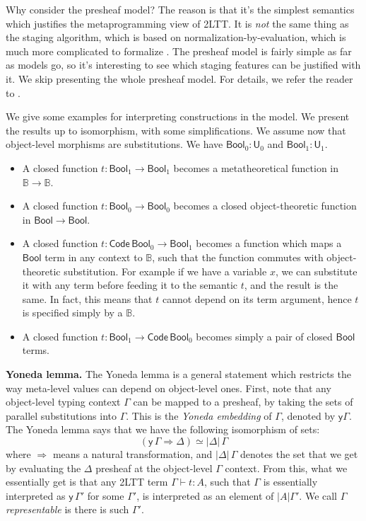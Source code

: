 \documentclass[11pt,a4paper,twoside]{article}
\newcommand{\msf}[1]{\mathsf{#1}}
\newcommand{\U}{\mathsf{U}}
\newcommand{\Code}{\mathsf{Code}}
\newcommand{\Bool}{\msf{Bool}}
\begin{document}
Why consider the presheaf model?  The reason is that it's the simplest semantics
which justifies the metaprogramming view of 2LTT. It is \emph{not} the same
thing as the staging algorithm, which is based on normalization-by-evaluation,
which is much more complicated to formalize \cite{bocquet2021induction}. The
presheaf model is fairly simple as far as models go, so it's interesting to see
which staging features can be justified with it. We skip presenting the whole
presheaf model. For details, we refer the reader to
\cite[Section~1.2]{huber-thesis}.

We give some examples for interpreting constructions in the model. We present the
results up to isomorphism, with some simplifications. We assume now that
object-level morphisms are substitutions. We have $\Bool_0 : \U_0$ and $\Bool_1
: \U_1$.
\begin{itemize}
  \item A closed function $t : \Bool_1 \to \Bool_1$ becomes a metatheoretical
    function in $\mathbb{B} \to \mathbb{B}$.
  \item A closed function $t : \Bool_0 \to \Bool_0$ becomes a closed object-theoretic
    function in $\Bool \to \Bool$.
  \item A closed function $t : \Code\,\Bool_0 \to \Bool_1$ becomes a function
    which maps a $\Bool$ term in any context to $\mathbb{B}$, such that the
    function commutes with object-theoretic substitution. For example if we have
    a variable $x$, we can substitute it with any term before feeding it to the
    semantic $t$, and the result is the same. In fact, this means that $t$
    cannot depend on its term argument, hence $t$ is specified simply by a
    $\mathbb{B}$.
  \item
    A closed function $t : \Bool_1 \to \Code\,\Bool_0$ becomes simply a pair of
    closed $\Bool$ terms.
\end{itemize}
\noindent\textbf{Yoneda lemma.} The Yoneda lemma is a general statement which
restricts the way meta-level values can depend on object-level ones. First, note that any
object-level typing context $\Gamma$ can be mapped to a presheaf, by taking the
sets of parallel substitutions into $\Gamma$. This is the \emph{Yoneda
embedding} of $\Gamma$, denoted by $\msf{y}\Gamma$. The Yoneda lemma says
that we have the following isomorphism of sets:
\[
   (\msf{y}\,\Gamma \Rightarrow \Delta) \simeq |\Delta|\,\Gamma
\]
where $\Rightarrow$ means a natural transformation, and $|\Delta|\,\Gamma$
denotes the set that we get by evaluating the $\Delta$ presheaf at the
object-level $\Gamma$ context. From this, what we essentially get is that any
2LTT term $\Gamma \vdash t : A$, such that $\Gamma$ is essentially interpreted
as $\msf{y}\,\Gamma'$ for some $\Gamma'$, is interpreted as an element of
$|A|\Gamma'$. We call $\Gamma$ \emph{representable} is there is such $\Gamma'$.
\end{document}
